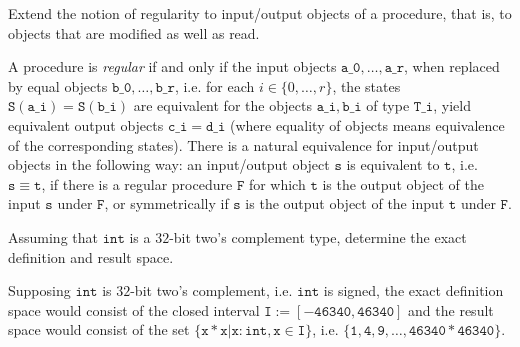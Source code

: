 \begin{Exercise}
    Extend the notion of regularity to input/output objects of a procedure, 
    that is, to objects that are modified as well as read.
\end{Exercise}

\begin{solution}
    A procedure is \textit{regular} if and only if the input objects 
    $\mathtt{a\_0, \dots, a\_r}$, when replaced by equal objects 
    $\mathtt{b\_0, \dots, b\_r}$, i.e. for each $i \in 
    \{0, \dots, r \}$, the states $\mathtt{S(a\_i) = S(b\_i)}$ are 
    equivalent for the objects $\mathtt{a\_i, b\_i}$ of type 
    $\mathtt{T\_i}$, yield equivalent output objects $\mathtt{c\_i = d\_i}$ 
    (where equality of objects means equivalence of the corresponding 
    states). There is a natural equivalence for input/output objects 
    in the following way: an input/output object $\mathtt{s}$ is 
    equivalent to $\mathtt{t}$, i.e. $\mathtt{s \equiv t}$, if 
    there is a regular procedure $\mathtt{F}$ for which $\mathtt{t}$ is 
    the output object of the input $\mathtt{s}$ under $\mathtt{F}$, or symmetrically 
    if $\mathtt{s}$ is the output object of the input $\mathtt{t}$ under $\mathtt{F}$.
\end{solution}

\begin{Exercise}
    Assuming that $\mathtt{int}$ is a $32$-bit two's complement type, determine 
    the exact definition and result space.
\end{Exercise}

\begin{solution}
    Supposing $\mathtt{int}$ is $32$-bit two's complement, i.e. $\mathtt{int}$ is 
    signed, the exact definition space would consist of the closed interval 
    $\mathtt{I := [-46340, 46340]}$ and the result space would consist of the set 
    $\{\mathtt{x*x}| \mathtt{x : int, x \in I}\}$, i.e. 
    $\{\mathtt{1, 4, 9, \dots, 46340*46340}\}$.
\end{solution}